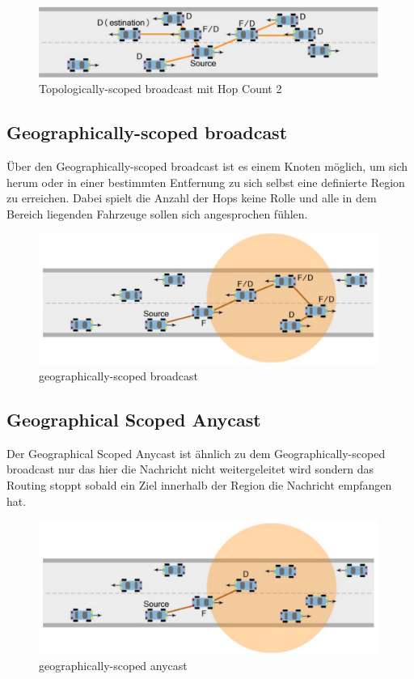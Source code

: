 \begin{figure}
	\includegraphics[width=0.99\textwidth]{content/images/03_networklayer/TSC.png}
	\caption{Topologically-scoped broadcast mit Hop Count 2 \cite{etsi102636-1}}
	\label{fig:tsc}
\end{figure}


\subsection{Geographically-scoped broadcast}
Über den Geographically-scoped broadcast ist es einem Knoten möglich, um sich herum oder in einer bestimmten Entfernung zu sich selbst eine definierte Region zu erreichen. Dabei spielt die Anzahl der Hops keine Rolle und alle in dem Bereich liegenden Fahrzeuge sollen sich angesprochen fühlen.

\begin{figure}
	\includegraphics[width=0.99\textwidth]{content/images/03_networklayer/GSB.png}
	\caption{geographically-scoped broadcast \cite{etsi102636-1}}
	\label{fig:gsb}
\end{figure}

\subsection{Geographical Scoped Anycast}
Der Geographical Scoped Anycast ist ähnlich zu dem Geographically-scoped broadcast nur das hier die Nachricht nicht weitergeleitet wird sondern das Routing stoppt sobald ein Ziel innerhalb der Region die Nachricht empfangen hat.

\begin{figure}
	\includegraphics[width=0.99\textwidth]{content/images/03_networklayer/GSA.png}
	\caption{geographically-scoped anycast \cite{etsi102636-1}}
	\label{fig:gsa}
\end{figure}

